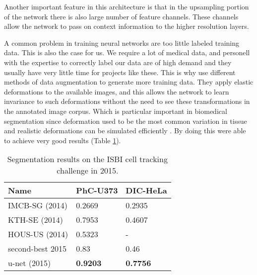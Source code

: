 \documentclass[thesis.tex]{subfiles}
\begin{document}
Another important feature in this architecture is that in the upsampling portion of the network there is also large number of feature channels. These channels allow the network to pass on context information to the higher resolution layers. 

A common problem in training neural networks are too little labeled training data. This is also the case for us. We require a lot of medical data, and personell with the expertise to correctly label our data are of high demand and they usually have very little time for projects like these. This is why \citeauthor*{UNetConvolutional15} use different methods of data augmentation to generate more training data. They apply elastic deformations to the available images, and this allows the network to learn invariance to such deformations without the need to see these transformations in the annotated image corpus. Which is particular important in biomedical segmentation since deformation used to be the most common variation in tissue and realistic deformations can be simulated efficiently \cite{UNetConvolutional15}. By doing this \citeauthor*{UNetConvolutional15} were able to achieve very good results (Table \ref{tab:segmentation_results}).

\begin{table} %
  \centering
  \begin{tabular}{ l l l }
  	\hline
    Name &				PhC-U373 &			DIC-HeLa 		\\
    \hline
    IMCB-SG (2014) &	0.2669 & 			0.2935 			\\
    KTH-SE (2014) &		0.7953 & 			0.4607 			\\ 
    HOUS-US (2014) &	0.5323 & 			- 				\\ 
    second-best 2015 &	0.83 & 				0.46 			\\
    u-net (2015) &		\textbf{0.9203} & 	\textbf{0.7756} \\
    \hline
  \end{tabular}
  \caption[Segmentation results on the ISBI cell tracking challenge in 2015]{Segmentation results on the ISBI cell tracking challenge in 2015.}
  \label{tab:segmentation_results}
\end{table}
\end{document}
